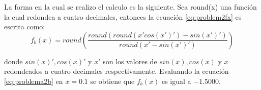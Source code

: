 La forma en la cual se realizo el calculo es la siguiente. Sea round(x) una función la cual redondea a cuatro decimales, entonces la ecuación \ref{eq:problem2fx} es escrita como:
\begin{equation}
    f_b(x) = round\left(\frac{round(round(x'cos(x')')-sin(x')')}{round(x'-sin(x')')}\right)
    \label{eq:problema2b}
\end{equation}

donde $sin(x)', cos(x)'$ y $x'$ son los valores de $sin(x),cos(x)$ y $x$ redondeados a cuatro decimales respectivamente. Evaluando la ecuación \ref{eq:problema2b} en $x=0.1$ se obtiene que $f_b(x)$ es igual a $-1.5000$.


